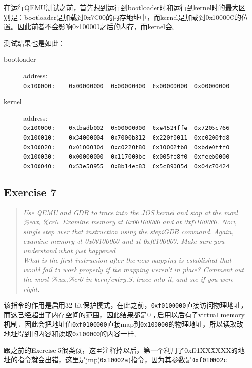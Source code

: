 在运行QEMU测试之前，首先想到运行到bootloader时和运行到kernel时的最大区别是：bootloader是加载到0x7C00的内存地址中，而kernel是加载到0x10000C的位置。因此前者不会影响0x100000之后的内存，而kernel会。

测试结果也是如此：
\begin{description}
\item[bootloader] address:\\
\lstinline{0x100000:	0x00000000	0x00000000	0x00000000	0x00000000}
\item[kernel] address:\\	
\lstinline{0x100000:	0x1badb002	0x00000000	0xe4524ffe	0x7205c766}\\
\lstinline{0x100010:	0x34000004	0x7000b812	0x220f0011	0xc0200fd8}\\
\lstinline{0x100020:	0x0100010d	0xc0220f80	0x10002fb8	0xbde0fff0}\\
\lstinline{0x100030:	0x00000000	0x117000bc	0x005fe8f0	0xfeeb0000}\\
\lstinline{0x100040:	0x53e58955	0x8b14ec83	0x5c89085d	0x04c70424}\\
\end{description}

\subsection{Exercise 7}
\begin{quote} \textit{Use QEMU and GDB to trace into the JOS kernel and stop at the movl \%eax, \%cr0. Examine memory at 0x00100000 and at 0xf0100000. Now, single step over that instruction using the stepiGDB command. Again, examine memory at 0x00100000 and at 0xf0100000. Make sure you understand what just happened.\\
What is the first instruction after the new mapping is established that would fail to work properly if the mapping weren't in place? Comment out the movl \%eax,\%cr0 in kern/entry.S, trace into it, and see if you were right.} \end{quote}

该指令的作用是启用32-bit保护模式，在此之前，\lstinline{0xf0100000}直接访问物理地址，而这已经超出了内存空间的范围，因此结果都是0；启用以后有了virtual memory机制，因此会把地址值\lstinline{0xf0100000}直接map到\lstinline{0x100000}的物理地址，所以读取改地址得到的内容和读取\lstinline{0x100000}的内容一样。

跟之前的Exercise 5很类似，这里注释掉以后，第一个利用了0xf01XXXXXX的地址的指令就会出错，这里是jmp(\lstinline{0x10002a})指令，因为其参数是\lstinline{0xf010002c}

